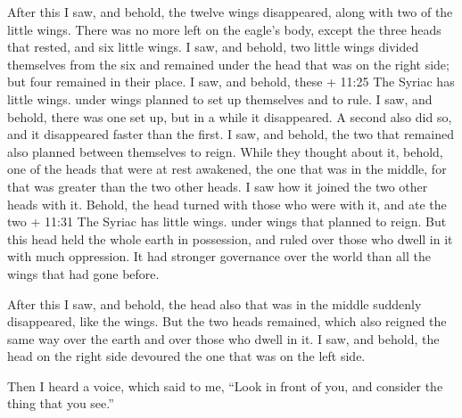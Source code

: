  After this I saw, and behold, the twelve wings
disappeared, along with two of the little wings.  There was
no more left on the eagle's body, except the three heads that rested,
and six little wings.  I saw, and behold, two little wings
divided themselves from the six and remained under the head that was on
the right side; but four remained in their place.  I saw,
and behold, these + 11:25 The Syriac has little wings. under wings
planned to set up themselves and to rule.  I saw, and
behold, there was one set up, but in a while it disappeared.
 A second also did so, and it disappeared faster than the
first.  I saw, and behold, the two that remained also
planned between themselves to reign.  While they thought
about it, behold, one of the heads that were at rest awakened, the one
that was in the middle, for that was greater than the two other heads.
 I saw how it joined the two other heads with it.
 Behold, the head turned with those who were with it, and
ate the two + 11:31 The Syriac has little wings. under wings that
planned to reign.  But this head held the whole earth in
possession, and ruled over those who dwell in it with much oppression.
It had stronger governance over the world than all the wings that had
gone before.

 After this I saw, and behold, the head also that was in
the middle suddenly disappeared, like the wings.  But the
two heads remained, which also reigned the same way over the earth and
over those who dwell in it.  I saw, and behold, the head on
the right side devoured the one that was on the left side.

 Then I heard a voice, which said to me, ``Look in front of
you, and consider the thing that you see.''

